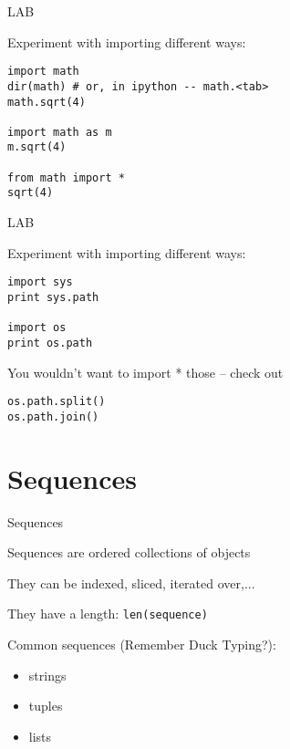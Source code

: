 \documentclass{beamer}
\begin{document}
\begin{frame}[fragile]{LAB}

{\Large  Experiment with importing different ways:}
\begin{verbatim}
import math
dir(math) # or, in ipython -- math.<tab>
math.sqrt(4)

import math as m
m.sqrt(4)

from math import *
sqrt(4)
\end{verbatim}

\end{frame}

\begin{frame}[fragile]{LAB}

{\Large  Experiment with importing different ways:}
\begin{verbatim}
import sys
print sys.path

import os
print os.path
\end{verbatim}
{\Large You wouldn't want to import * those -- check out}
\begin{verbatim}
os.path.split()
os.path.join()
\end{verbatim}

\end{frame}



\section {Sequences}

\begin{frame}[fragile]{Sequences}

{\Large Sequences are ordered collections of objects}

\vfill
{\Large They can be indexed, sliced, iterated over,...}

\vfill
{\Large They have a length:  \verb+len(sequence)+}

\vfill
{\Large Common sequences (Remember Duck Typing?):}

{\Large
\begin{itemize}
   \item strings
   \item tuples
   \item lists
\end{itemize}
}

\end{frame}
\end{document}
